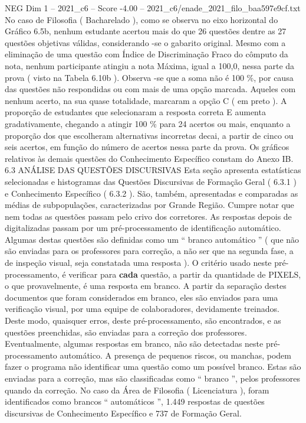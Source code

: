 \begin{textsample}{NEG Dim 1 – 2021\_c6 – Score -4.00 – 2021\_c6/enade\_2021\_filo\_baa597e9cf.txt}
No caso de Filosofia ( Bacharelado ), como se observa no eixo horizontal do Gráfico 6.5b, nenhum estudante acertou mais do que 26 questões dentre as 27 questões objetivas válidas, considerando -se o gabarito original.
Mesmo com a eliminação de uma questão com Índice de Discriminação Fraco do cômputo da nota, nenhum participante atingiu a nota Máxima, igual a 100,0, nessa parte da prova ( visto na Tabela 6.10b ).
Observa -se que a soma não é 100 \%, por causa das questões não respondidas ou com mais de uma opção marcada.
Aqueles com nenhum acerto, na sua quase totalidade, marcaram a opção C ( em preto ).
A proporção de estudantes que selecionaram a resposta correta E aumenta gradativamente, chegando a atingir 100 \% para 24 acertos ou mais, enquanto a proporção dos que escolheram alternativas incorretas decai, a partir de cinco ou seis acertos, em função do número de acertos nessa parte da prova.
Os gráficos relativos às demais questões do Conhecimento Específico constam do Anexo IB. 6.3 ANÁLISE DAS QUESTÕES DISCURSIVAS Esta seção apresenta estatísticas selecionadas e histogramas das Questões Discursivas de Formação Geral ( 6.3.1 ) e Conhecimento Específico ( 6.3.2 ).
São, também, apresentadas e comparadas as médias de subpopulações, caracterizadas por Grande Região.
Cumpre notar que nem todas as questões passam pelo crivo dos corretores.
As respostas depois de digitalizadas passam por um pré-processamento de identificação automático.
Algumas destas questões são definidas como um “ branco automático ” ( que não são enviadas para os professores para correção, a não ser que na segunda fase, a de inspeção visual, seja constatada uma resposta ).
O critério usado neste pré-processamento, é verificar para \textbf{cada} questão, a partir da quantidade de PIXELS, o que provavelmente, é uma resposta em branco.
A partir da separação destes documentos que foram considerados em branco, eles são enviados para uma verificação visual, por uma equipe de colaboradores, devidamente treinados.
Deste modo, quaisquer erros, deste pré-processamento, são encontrados, e as questões preenchidas, são enviadas para a correção dos professores.
Eventualmente, algumas respostas em branco, não são detectadas neste pré-processamento automático.
A presença de pequenos riscos, ou manchas, podem fazer o programa não identificar uma questão como um possível branco.
Estas são enviadas para a correção, mas são classificadas como “ branco ”, pelos professores quando da correção.
No caso da Área de Filosofia ( Licenciatura ), foram identificados como brancos “ automáticos ”, 1.449 respostas de questões discursivas de Conhecimento Específico e 737 de Formação Geral.

\end{textsample}

